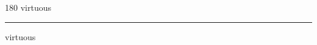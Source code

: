 
\begin{frame}
\begin{center}
\begin{turn}{180}
{\fontsize{2.5cm}{1em}\selectfont virtuous}
\end{turn}
\vspace{1em}\par  
\hrule
\vspace{1em}\par  
{\fontsize{2.5cm}{1em}\selectfont virtuous}
\end{center}
\end{frame}
